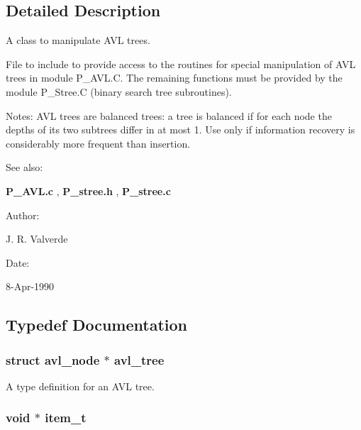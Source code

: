 \subsection{Detailed Description}
A class to manipulate AVL trees.

 

 File to include to provide access to the routines for special manipulation of AVL trees in module P\_\-AVL.C. The remaining functions must be provided by the module P\_\-Stree.C (binary search tree subroutines).

Notes: AVL trees are balanced trees: a tree is balanced if for each node the depths of its two subtrees differ in at most 1. Use only if information recovery is considerably more frequent than insertion.

\begin{Desc}
\item[See also: ]\par
{\bf P\_\-AVL.c} , {\bf P\_\-stree.h} , {\bf P\_\-stree.c}\end{Desc}
\begin{Desc}
\item[Author: ]\par
J. R. Valverde \end{Desc}
\begin{Desc}
\item[Date: ]\par
8-Apr-1990\end{Desc}


\subsection{Typedef Documentation}
\subsubsection{\setlength{\rightskip}{0pt plus 5cm}struct {\bf avl\_\-node} $\ast$ avl\_\-tree}\label{P__AVL_8h_a1}


A type definition for an AVL tree.

\subsubsection{\setlength{\rightskip}{0pt plus 5cm}void $\ast$ item\_\-t}\label{P__AVL_8h_a0}


